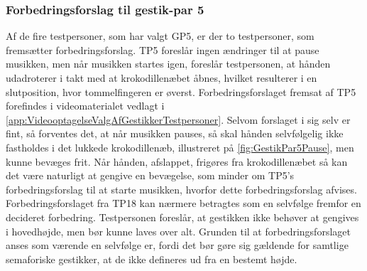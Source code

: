 \subsubsection{Forbedringsforslag til gestik-par 5}
\label{TestresultaterValgAfGestikkerForbedringGP5Pause}
%
Af de fire testpersoner, som har valgt GP5, er der to testpersoner, som fremsætter forbedringsforslag. TP5 foreslår ingen ændringer til at pause musikken, men når musikken startes igen, foreslår testpersonen, at hånden udadroterer i takt med at krokodillenæbet åbnes, hvilket resulterer i en slutposition, hvor tommelfingeren er øverst. Forbedringsforslaget fremsat af TP5 forefindes i videomaterialet vedlagt i \autoref{app:VideooptagelseValgAfGestikkerTestpersoner}. Selvom forslaget i sig selv er fint, så forventes det, at når musikken pauses, så skal hånden selvfølgelig ikke fastholdes i det lukkede krokodillenæb, illustreret på \autoref{fig:GestikPar5Pause}, men kunne bevæges frit. Når hånden, afslappet, frigøres fra krokodillenæbet så kan det være naturligt at gengive en bevægelse, som minder om TP5's forbedringsforslag til at starte musikken, hvorfor dette forbedringsforslag afvises. Forbedringsforslaget fra TP18 kan nærmere betragtes som en selvfølge fremfor en decideret forbedring. Testpersonen foreslår, at gestikken ikke behøver at gengives i hovedhøjde, men bør kunne laves over alt. Grunden til at forbedringsforslaget anses som værende en selvfølge er, fordi det bør gøre sig gældende for samtlige semaforiske gestikker, at de ikke defineres ud fra en bestemt højde.
%
